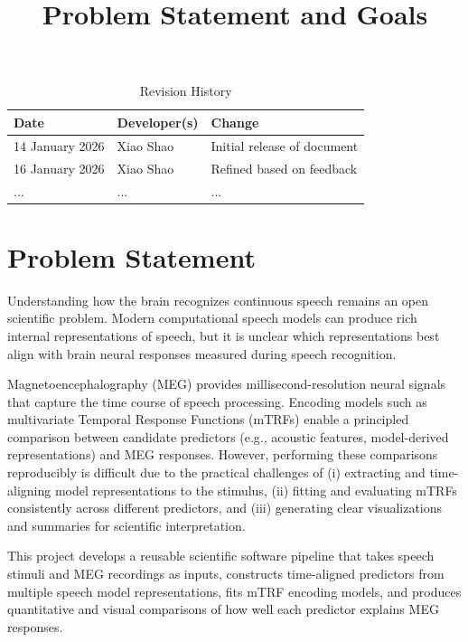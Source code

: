 \documentclass{article}
\title{Problem Statement and Goals\\\progname}
\author{\authname}
\begin{document}
\maketitle

\begin{table}[hp]
\caption{Revision History} \label{TblRevisionHistory}
\begin{tabularx}{\textwidth}{llX}
\toprule
\textbf{Date} & \textbf{Developer(s)} & \textbf{Change}\\
\midrule
14 January 2026 & Xiao Shao & Initial release of document\\
16 January 2026 & Xiao Shao & Refined based on feedback \\
... & ... & ...\\
\bottomrule
\end{tabularx}
\end{table}


\section{Problem Statement}



Understanding how the brain recognizes continuous speech remains an open
scientific problem. Modern computational speech models can produce rich internal
representations of speech, but it is unclear which representations best align
with brain neural responses measured during speech recognition.

Magnetoencephalography (MEG) provides millisecond-resolution neural signals that
capture the time course of speech processing. Encoding models such as
multivariate Temporal Response Functions (mTRFs) enable a principled comparison
between candidate predictors (e.g., acoustic features, model-derived
representations) and MEG responses. However, performing these comparisons
reproducibly is difficult due to the practical challenges of (i) extracting and
time-aligning model representations to the stimulus, (ii) fitting and evaluating
mTRFs consistently across different predictors, and (iii) generating clear visualizations
and summaries for scientific interpretation.

This project develops a reusable scientific software pipeline that takes speech
stimuli and MEG recordings as inputs, constructs time-aligned predictors from
multiple speech model representations, fits mTRF encoding models, and produces
quantitative and visual comparisons of how well each predictor explains MEG
responses.
\end{document}
